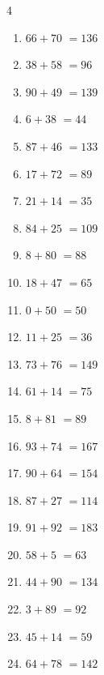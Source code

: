 \begin{multicols}{4}
\begin{enumerate}
  \item $66+70$
        $=136$

  \item $38+58$
        $=96$

  \item $90+49$
        $=139$

  \item $6+38$
        $=44$

  \item $87+46$
        $=133$

  \item $17+72$
        $=89$

  \item $21+14$
        $=35$

  \item $84+25$
        $=109$

  \item $8+80$
        $=88$

  \item $18+47$
        $=65$

  \item $0+50$
        $=50$

  \item $11+25$
        $=36$

  \item $73+76$
        $=149$

  \item $61+14$
        $=75$

  \item $8+81$
        $=89$

  \item $93+74$
        $=167$

  \item $90+64$
        $=154$

  \item $87+27$
        $=114$

  \item $91+92$
        $=183$

  \item $58+5$
        $=63$

  \item $44+90$
        $=134$

  \item $3+89$
        $=92$

  \item $45+14$
        $=59$

  \item $64+78$
        $=142$


\end{enumerate}
\end{multicols}
